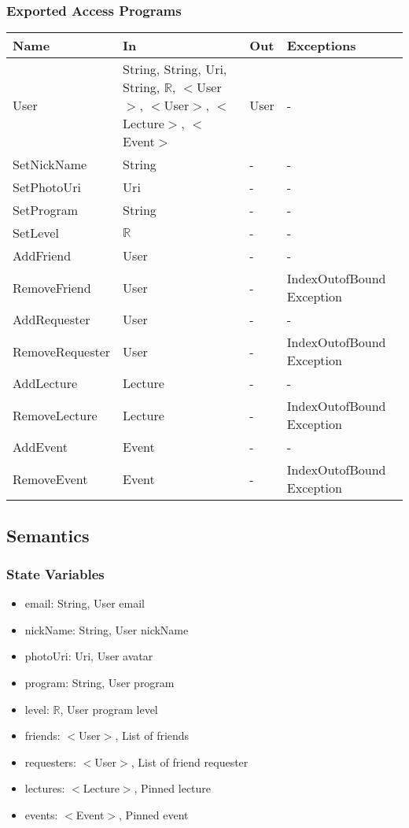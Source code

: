 \documentclass[12pt, titlepage]{article}
\begin{document}
\subsubsection{Exported Access Programs}
\begin{center}
\begin{tabular}{p{4cm} p{2cm} p{4cm} p{4cm}}
\hline
\textbf{Name} & \textbf{In} & \textbf{Out} & \textbf{Exceptions} \\
\hline
User & String, String, Uri, String, $\mathbb{R}$, $<$User$>$, $<$User$>$, $<$Lecture$>$, $<$Event$>$ & User & -\\
SetNickName & String & - & -\\
SetPhotoUri & Uri & - & -\\
SetProgram & String & - & -\\
SetLevel & $\mathbb{R}$ & - & -\\
AddFriend & User & - & -\\
RemoveFriend & User & - & IndexOutofBound Exception\\
AddRequester & User & - & -\\
RemoveRequester & User & - & IndexOutofBound Exception\\
AddLecture & Lecture & - & -\\
RemoveLecture & Lecture & - & IndexOutofBound Exception\\
AddEvent & Event & - & -\\
RemoveEvent & Event & - & IndexOutofBound Exception\\
\hline
\end{tabular}
\end{center}

\subsection{Semantics}

\subsubsection{State Variables}

\begin{itemize}
\item email: String, User email
\item nickName: String, User nickName
\item photoUri: Uri, User avatar
\item program: String, User program
\item level: $\mathbb{R}$, User program level
\item friends: $<$User$>$, List of friends
\item requesters: $<$User$>$, List of friend requester
\item lectures: $<$Lecture$>$, Pinned lecture
\item events: $<$Event$>$, Pinned event
\end{itemize}
\end{document}
